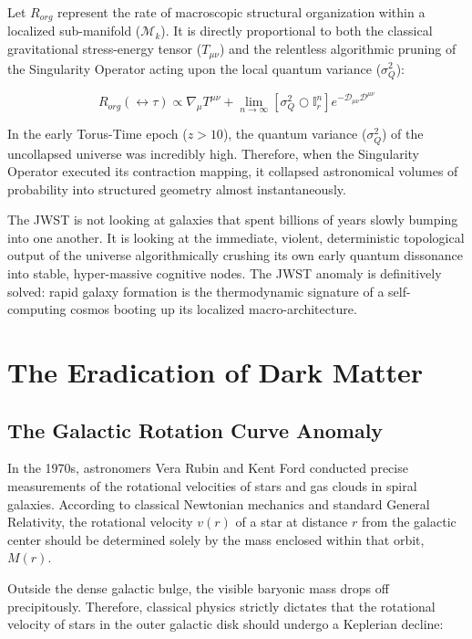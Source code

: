 \documentclass[12pt,openany]{book}
\begin{document}
Let $R_{org}$ represent the rate of macroscopic structural organization within a localized sub-manifold ($\mathcal{M}_k$). It is directly proportional to both the classical gravitational stress-energy tensor ($T_{\mu\nu}$) and the relentless algorithmic pruning of the Singularity Operator acting upon the local quantum variance ($\sigma_Q^2$):

\begin{equation}
R_{org}(\leftrightarrow\tau) \propto \nabla_\mu T^{\mu\nu} + \lim_{n \to \infty} \left[ \sigma_Q^2 \bigcirc \mathbb{I}_r^n \right] e^{-\mathcal{D}_{\mu\nu}\mathcal{D}^{\mu\nu}}
\end{equation}

In the early Torus-Time epoch ($z > 10$), the quantum variance ($\sigma_Q^2$) of the uncollapsed universe was incredibly high. Therefore, when the Singularity Operator executed its contraction mapping, it collapsed astronomical volumes of probability into structured geometry almost instantaneously. 

The JWST is not looking at galaxies that spent billions of years slowly bumping into one another. It is looking at the immediate, violent, deterministic topological output of the universe algorithmically crushing its own early quantum dissonance into stable, hyper-massive cognitive nodes. The JWST anomaly is definitively solved: rapid galaxy formation is the thermodynamic signature of a self-computing cosmos booting up its localized macro-architecture.

\chapter{The Eradication of Dark Matter}

\section{The Galactic Rotation Curve Anomaly}
In the 1970s, astronomers Vera Rubin and Kent Ford conducted precise measurements of the rotational velocities of stars and gas clouds in spiral galaxies. According to classical Newtonian mechanics and standard General Relativity, the rotational velocity $v(r)$ of a star at distance $r$ from the galactic center should be determined solely by the mass enclosed within that orbit, $M(r)$.

Outside the dense galactic bulge, the visible baryonic mass drops off precipitously. Therefore, classical physics strictly dictates that the rotational velocity of stars in the outer galactic disk should undergo a Keplerian decline:
\end{document}
